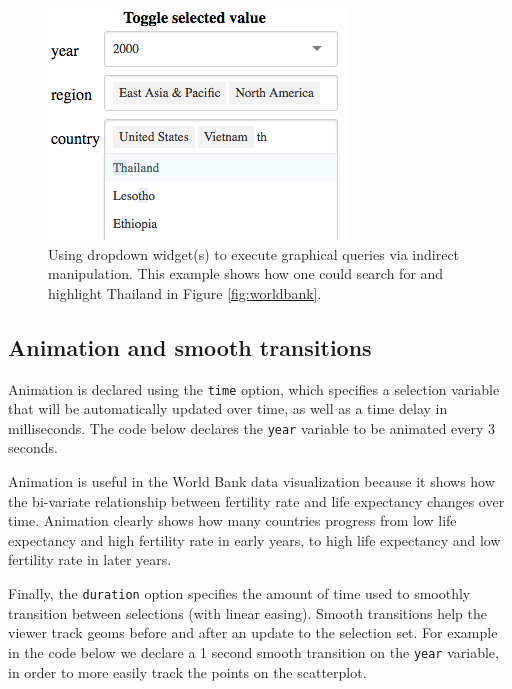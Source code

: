 \documentclass[12pt,]{article}
\newenvironment{Shaded}{\begin{snugshade}}{\end{snugshade}}
\newcommand{\DataTypeTok}[1]{\textcolor[rgb]{0.13,0.29,0.53}{#1}}
\newcommand{\DecValTok}[1]{\textcolor[rgb]{0.00,0.00,0.81}{#1}}
\newcommand{\KeywordTok}[1]{\textcolor[rgb]{0.13,0.29,0.53}{\textbf{#1}}}
\newcommand{\NormalTok}[1]{#1}
\newcommand{\OperatorTok}[1]{\textcolor[rgb]{0.81,0.36,0.00}{\textbf{#1}}}
\newcommand{\StringTok}[1]{\textcolor[rgb]{0.31,0.60,0.02}{#1}}
\theoremstyle{definition}
\theoremstyle{definition}
\theoremstyle{definition}
\theoremstyle{remark}
\begin{document}
\begin{figure}
\centering
\includegraphics{images/dropdown}
\caption{\label{fig:widgets}Using dropdown widget(s) to execute graphical
queries via indirect manipulation. This example shows how one could
search for and highlight Thailand in Figure \ref{fig:worldbank}.}
\end{figure}

\hypertarget{animation}{%
\subsection{Animation and smooth transitions}\label{animation}}

Animation is declared using the \texttt{time} option, which specifies a
selection variable that will be automatically updated over time, as well
as a time delay in milliseconds. The code below declares the
\texttt{year} variable to be animated every 3 seconds.

\begin{Shaded}
\end{Shaded}

Animation is useful in the World Bank data visualization because it
shows how the bi-variate relationship between fertility rate and life
expectancy changes over time. Animation clearly shows how many countries
progress from low life expectancy and high fertility rate in early
years, to high life expectancy and low fertility rate in later years.

Finally, the \texttt{duration} option specifies the amount of time used
to smoothly transition between selections (with linear easing). Smooth
transitions help the viewer track geoms before and after an update to
the selection set. For example in the code below we declare a 1 second
smooth transition on the \texttt{year} variable, in order to more easily
track the points on the scatterplot.
\end{document}
